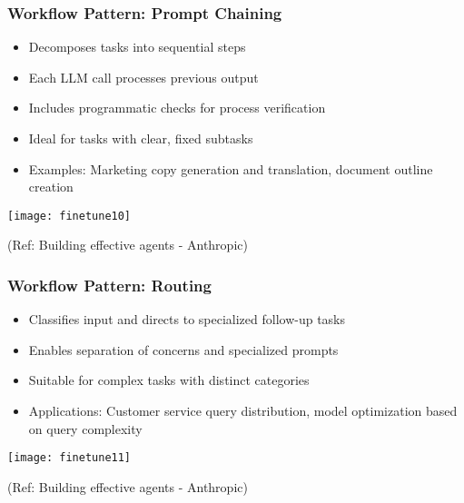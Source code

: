 \begin{frame}[fragile]\frametitle{Workflow Pattern: Prompt Chaining}
\begin{itemize}
    \item Decomposes tasks into sequential steps
    \item Each LLM call processes previous output
    \item Includes programmatic checks for process verification
    \item Ideal for tasks with clear, fixed subtasks
    \item Examples: Marketing copy generation and translation, document outline creation
\end{itemize}

\begin{center}
\texttt{[image: finetune10]}
\end{center}

{\tiny (Ref: Building effective agents - Anthropic)}
\end{frame}

\begin{frame}[fragile]\frametitle{Workflow Pattern: Routing}
\begin{itemize}
    \item Classifies input and directs to specialized follow-up tasks
    \item Enables separation of concerns and specialized prompts
    \item Suitable for complex tasks with distinct categories
    \item Applications: Customer service query distribution, model optimization based on query complexity
\end{itemize}

\begin{center}
\texttt{[image: finetune11]}
\end{center}

{\tiny (Ref: Building effective agents - Anthropic)}
\end{frame}

